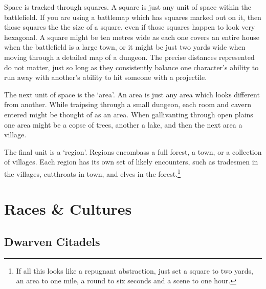\documentclass[titlepage,a4paper,openany]{book}
\begin{document}
\begin{multicols}{2}
Space is tracked through \glspl{square}. A \gls{square} is just any unit of space within the battlefield. If you are using a battlemap which has squares marked out on it, then those squares the the size of a square, even if those squares happen to look very hexagonal. A square might be ten metres wide as each one covers an entire house when the battlefield is a large town, or it might be just two yards wide when moving through a detailed map of a dungeon. The precise distances represented do not matter, just so long as they consistently balance one character's ability to run away with another's ability to hit someone with a projectile.

The next unit of space is the `\gls{area}'.
An \gls{area} is just any \gls{area} which looks different from another.
While traipsing through a small dungeon, each room and cavern entered might be thought of as an \gls{area}.
When gallivanting through open plains one \gls{area} might be a copse of trees, another a lake, and then the next area a village.

The final unit is a `region'.
Regions encombass a full forest, a town, or a collection of villages.
Each region has its own set of likely encounters, such as tradesmen in the villages, cutthroats in town, and elves in the forest.\footnote{If all this looks like a repugnant abstraction, just set a square to two yards, an area to one mile, a \gls{round} to six seconds and a scene to one hour.}

\end{multicols}

\chapter{Races \& Cultures}

\section[Dwarves]{Dwarven Citadels}
\end{document}
